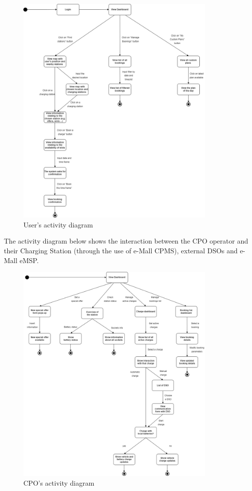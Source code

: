\documentclass[12pt]{report}
\begin{document}
    \begin{figure}[h]
        \centering
        \includegraphics[width=0.88\textwidth]{assets/activitydiagram1.png}
        \caption{User's activity diagram}
    \end{figure}
\clearpage
\noindent The activity diagram below shows the interaction between the CPO operator and their Charging Station (through the use of e-Mall CPMS), external DSOs and e-Mall eMSP.

\bigskip

\begin{figure}[h]
    \centering
    \includegraphics[width=0.88\textwidth]{assets/activitydiagram2.png}
    \caption{CPO's activity diagram}
\end{figure}
\newpage
\end{document}
